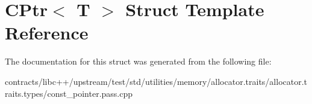 \hypertarget{struct_c_ptr}{}\section{C\+Ptr$<$ T $>$ Struct Template Reference}
\label{struct_c_ptr}


The documentation for this struct was generated from the following file\+:\begin{DoxyCompactItemize}
\item 
contracts/libc++/upstream/test/std/utilities/memory/allocator.\+traits/allocator.\+traits.\+types/const\+\_\+pointer.\+pass.\+cpp\end{DoxyCompactItemize}

